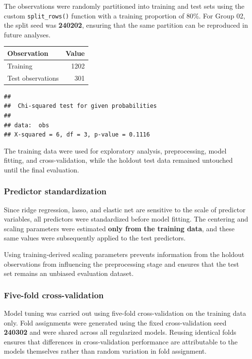 \documentclass[
  11pt,
]{article}
\newcounter{none} %
\begin{document}
The observations were randomly partitioned into training and test sets
using the custom \texttt{split\_rows()} function with a training
proportion of 80\%. For Group 02, the split seed was \textbf{240202},
ensuring that the same partition can be reproduced in future analyses.

{\def\LTcaptype{none} %
\begin{longtable}[]{@{}lr@{}}
\toprule\noalign{}
Observation & Value \\
\midrule\noalign{}
\endhead
\bottomrule\noalign{}
\endlastfoot
Training & 1202 \\
Test observations & 301 \\
\end{longtable}
}

\begin{verbatim}
## 
##  Chi-squared test for given probabilities
## 
## data:  obs
## X-squared = 6, df = 3, p-value = 0.1116
\end{verbatim}

The training data were used for exploratory analysis, preprocessing,
model fitting, and cross-validation, while the holdout test data
remained untouched until the final evaluation.

\subsubsection{Predictor
standardization}\label{predictor-standardization}

Since ridge regression, lasso, and elastic net are sensitive to the
scale of predictor variables, all predictors were standardized before
model fitting. The centering and scaling parameters were estimated
\textbf{only from the training data}, and these same values were
subsequently applied to the test predictors.

Using training-derived scaling parameters prevents information from the
holdout observations from influencing the preprocessing stage and
ensures that the test set remains an unbiased evaluation dataset.

\subsubsection{Five-fold
cross-validation}\label{five-fold-cross-validation}

Model tuning was carried out using five-fold cross-validation on the
training data only. Fold assignments were generated using the fixed
cross-validation seed \textbf{240302} and were shared across all
regularized models. Reusing identical folds ensures that differences in
cross-validation performance are attributable to the models themselves
rather than random variation in fold assignment.
\end{document}
